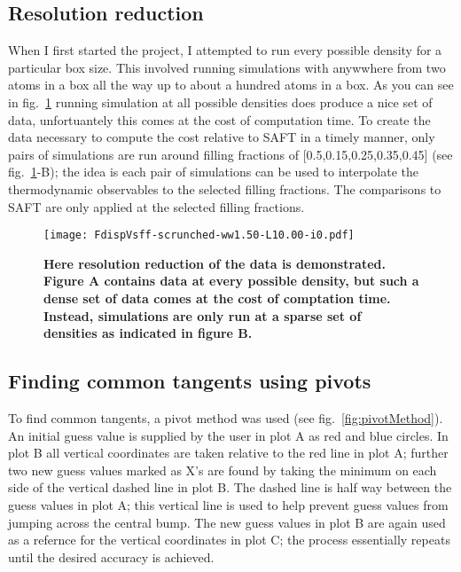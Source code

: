 \subsection{Resolution reduction}
When I first started the project, I attempted to run every possible density for a particular box size. This involved running simulations with anywwhere from two atoms in a box all the way up to about a hundred atoms in a box. As you can see in fig.~\ref{fig:FdispVsff} running simulation at all possible densities does produce a nice set of data, unfortuantely this comes at the cost of computation time. To create the data necessary to compute the cost relative to SAFT in a timely manner, only pairs of simulations are run around filling fractions of [0.5,0.15,0.25,0.35,0.45] (see fig.~\ref{fig:FdispVsff}-B); the idea is each pair of simulations can be used to interpolate the thermodynamic observables to the selected filling fractions. The comparisons to SAFT are only applied at the selected filling fractions.
\begin{figure}[h]
	\centering
	\texttt{[image: FdispVsff-scrunched-ww1.50-L10.00-i0.pdf]}
	\caption{\label{fig:FdispVsff}
	\scriptsize \textbf{Here resolution reduction of the data is demonstrated. Figure A contains data at every possible density, but such a dense set of data comes at the cost of comptation time. Instead, simulations are only run at a sparse set of densities as indicated in figure B.}}
	
\end{figure}
\vspace*{-10mm}
\subsection{Finding common tangents using pivots}
To find common tangents, a pivot method was used (see fig.~\ref{fig:pivotMethod}). An initial guess value is supplied by the user in plot A as red and blue circles. In plot B all vertical coordinates are taken relative to the red line in plot A; further two new guess values marked as X's are found by taking the minimum on each side of the vertical dashed line in plot B. The dashed line is half way between the guess values in plot A; this vertical line is used to help prevent guess values from jumping across the central bump. The new guess values in plot B are again used as a refernce for the vertical coordinates in plot C; the process essentially repeats until the desired accuracy is achieved.

